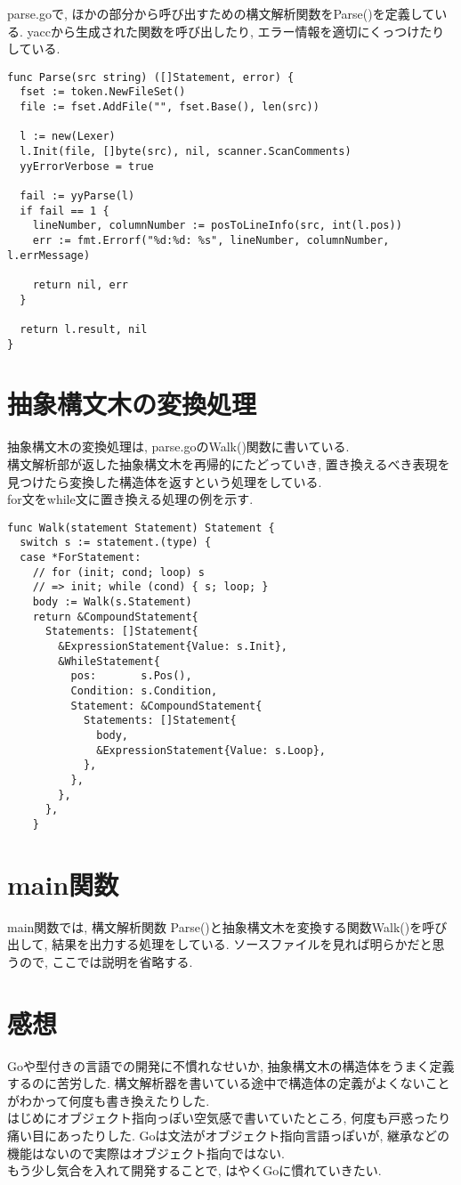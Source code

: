 \documentclass[a4j]{jarticle}
\begin{document}
parse.goで, ほかの部分から呼び出すための構文解析関数をParse()を定義している. yaccから生成された関数を呼び出したり, エラー情報を適切にくっつけたりしている.

\begin{verbatim}
func Parse(src string) ([]Statement, error) {
  fset := token.NewFileSet()
  file := fset.AddFile("", fset.Base(), len(src))

  l := new(Lexer)
  l.Init(file, []byte(src), nil, scanner.ScanComments)
  yyErrorVerbose = true

  fail := yyParse(l)
  if fail == 1 {
    lineNumber, columnNumber := posToLineInfo(src, int(l.pos))
    err := fmt.Errorf("%d:%d: %s", lineNumber, columnNumber, l.errMessage)

    return nil, err
  }

  return l.result, nil
}
\end{verbatim}

\section{抽象構文木の変換処理}
抽象構文木の変換処理は, parse.goのWalk()関数に書いている. \\

構文解析部が返した抽象構文木を再帰的にたどっていき, 置き換えるべき表現を見つけたら変換した構造体を返すという処理をしている. \\

for文をwhile文に置き換える処理の例を示す.

\begin{verbatim}
func Walk(statement Statement) Statement {
  switch s := statement.(type) {
  case *ForStatement:
    // for (init; cond; loop) s
    // => init; while (cond) { s; loop; }
    body := Walk(s.Statement)
    return &CompoundStatement{
      Statements: []Statement{
        &ExpressionStatement{Value: s.Init},
        &WhileStatement{
          pos:       s.Pos(),
          Condition: s.Condition,
          Statement: &CompoundStatement{
            Statements: []Statement{
              body,
              &ExpressionStatement{Value: s.Loop},
            },
          },
        },
      },
    }

\end{verbatim}

\section{main関数}
main関数では, 構文解析関数 Parse()と抽象構文木を変換する関数Walk()を呼び出して, 結果を出力する処理をしている. ソースファイルを見れば明らかだと思うので, ここでは説明を省略する.

\section{感想}
Goや型付きの言語での開発に不慣れなせいか, 抽象構文木の構造体をうまく定義するのに苦労した. 構文解析器を書いている途中で構造体の定義がよくないことがわかって何度も書き換えたりした. \\

はじめにオブジェクト指向っぽい空気感で書いていたところ, 何度も戸惑ったり痛い目にあったりした. Goは文法がオブジェクト指向言語っぽいが, 継承などの機能はないので実際はオブジェクト指向ではない. \\

もう少し気合を入れて開発することで, はやくGoに慣れていきたい.
\end{document}
